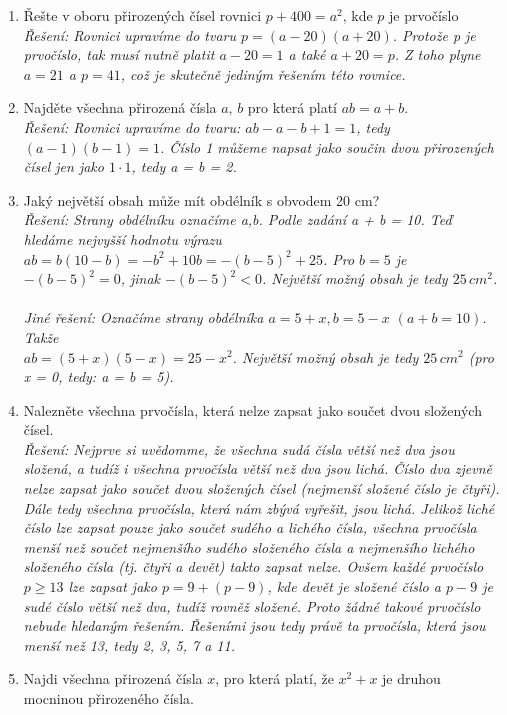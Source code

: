 \documentclass[12pt,a4paper]{report}
\begin{document}
\begin{enumerate}
	\item Řešte v oboru přirozených čísel rovnici $p+400=a^2$, kde $p$ je prvočíslo
	\\ \textit{Řešení: Rovnici upravíme do tvaru $p = (a -20)(a + 20)$. Protože p je prvočíslo, tak musí nutně platit $a - 20 = 1$ a také $a + 20 = p$. Z toho plyne $a = 21$ a $p = 41$, což je skutečně jediným řešením této rovnice.}
	\item Najděte všechna přirozená čísla $a,\,b$ pro která platí $ab=a+b$.
	\\ \textit{Řešení: Rovnici upravíme do tvaru: $ab-a-b+1=1$, tedy $(a-1)(b-1)=1$. Číslo 1 můžeme napsat jako součin dvou přirozených čísel jen jako $1\cdot1$, tedy a = b = 2.}
	\item Jaký největší obsah může mít obdélník s obvodem 20 cm?
	\\ \textit{Řešení: Strany obdélníku označíme a,b. Podle zadání a + b = 10. Teď hledáme nejvyšší hodnotu výrazu $ab=b(10-b)=-b^2+10b=-(b-5)^2+25$. Pro $b = 5$ je $-(b-5)^2=0$, jinak $-(b-5)^2<0$. Největší možný obsah je tedy $25\,cm^2$.}
	\\\\ \textit{Jiné řešení: Označíme strany obdélníka $a = 5 + x, b = 5 - x$ $(a+b=10)$. Takže \\$ab=(5+x)(5-x)=25-x^2$. Největší možný obsah je tedy $25\, cm^2$ (pro x = 0, tedy: a = b = 5).}
	\item Nalezněte všechna prvočísla, která nelze zapsat jako součet dvou složených čísel.
	\\ \textit{Řešení: Nejprve si uvědomme, že všechna sudá čísla větší než dva jsou složená, a tudíž i všechna prvočísla
		větší než dva jsou lichá. Číslo dva zjevně nelze zapsat jako součet dvou složených čísel (nejmenší
		složené číslo je čtyři). Dále tedy všechna prvočísla, která nám zbývá vyřešit, jsou lichá.
		Jelikož liché číslo lze zapsat pouze jako součet sudého a lichého čísla, všechna prvočísla menší
		než součet nejmenšího sudého složeného čísla a nejmenšího lichého složeného čísla (tj. čtyři a devět)
		takto zapsat nelze. Ovšem každé prvočíslo $p \geq 13$ lze zapsat jako $p = 9 + (p - 9)$, kde devět je
		složené číslo a $p - 9$ je sudé číslo větší než dva, tudíž rovněž složené. Proto žádné takové prvočíslo
		nebude hledaným řešením.
		Řešeními jsou tedy právě ta prvočísla, která jsou menší než 13, tedy 2, 3, 5, 7 a 11.}
	\item Najdi všechna přirozená čísla $x$, pro která platí, že $x^2+x$ je druhou mocninou přirozeného čísla.  

\end{enumerate}
\end{document}
